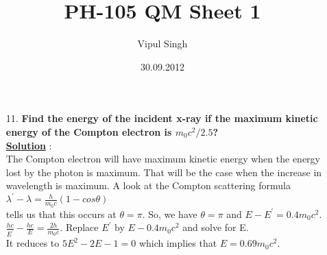 \documentclass[10pt, a4paper]{article}
\begin{document}
\title{PH-105 QM Sheet 1}
\date{30.09.2012}
\author{Vipul Singh}
\maketitle
\begin{enumerate}
\item[11.]{\bf Find the energy of the incident x-ray if the maximum kinetic energy of the Compton electron is $m_{0}c^{2}/2.5$?}\\

{\underline {\bf Solution}} : \\
The Compton electron will have maximum kinetic energy when the energy lost by the photon is maximum. That will be the case when the increase in wavelength is maximum. A look at the Compton scattering formula \\
$\lambda^{'}-\lambda=\frac{h}{m_{0}c}(1-cos\theta)$\\
tells us that this occurs at $\theta=\pi$.
So, we have $\theta=\pi$ and $E-E^{'}=0.4m_{0}c^{2}$.\\
$\frac{hc}{E^{'}}-\frac{hc}{E}=\frac{2h}{m_{0}c}$. Replace $E^{'}$ by $E-0.4m_{0}c^{2}$ and solve for E. \\
It reduces to $5E^{2}-2E-1=0$ which implies that $E=0.69m_{0}c^{2}$.
\end{enumerate}
\end{document}
